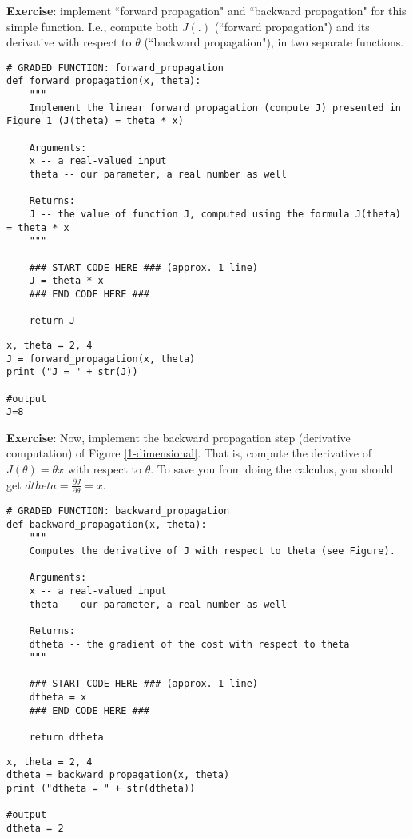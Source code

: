 {\textbf {Exercise}}: implement ``forward propagation" and ``backward propagation" for this simple function. I.e., compute both $J(.)$ (``forward propagation") and its derivative with respect to $\theta$ (``backward propagation"), in two separate functions. 


\begin{verbatim}
# GRADED FUNCTION: forward_propagation
def forward_propagation(x, theta):
    """
    Implement the linear forward propagation (compute J) presented in Figure 1 (J(theta) = theta * x)
    
    Arguments:
    x -- a real-valued input
    theta -- our parameter, a real number as well
    
    Returns:
    J -- the value of function J, computed using the formula J(theta) = theta * x
    """
    
    ### START CODE HERE ### (approx. 1 line)
    J = theta * x
    ### END CODE HERE ###
    
    return J
\end{verbatim}
\begin{verbatim}
x, theta = 2, 4
J = forward_propagation(x, theta)
print ("J = " + str(J))

#output
J=8
\end{verbatim}


{\textbf {Exercise}}: Now, implement the backward propagation step (derivative computation) of Figure \ref{1-dimensional}. That is, compute the derivative of $J(\theta) = \theta x$ with respect to $\theta$. To save you from doing the calculus, you should get $dtheta = \frac { \partial J }{ \partial \theta} = x$.
\begin{verbatim}
# GRADED FUNCTION: backward_propagation
def backward_propagation(x, theta):
    """
    Computes the derivative of J with respect to theta (see Figure).
    
    Arguments:
    x -- a real-valued input
    theta -- our parameter, a real number as well
    
    Returns:
    dtheta -- the gradient of the cost with respect to theta
    """
    
    ### START CODE HERE ### (approx. 1 line)
    dtheta = x
    ### END CODE HERE ###
    
    return dtheta
\end{verbatim}

\begin{verbatim}
x, theta = 2, 4
dtheta = backward_propagation(x, theta)
print ("dtheta = " + str(dtheta))

#output
dtheta = 2
\end{verbatim}



